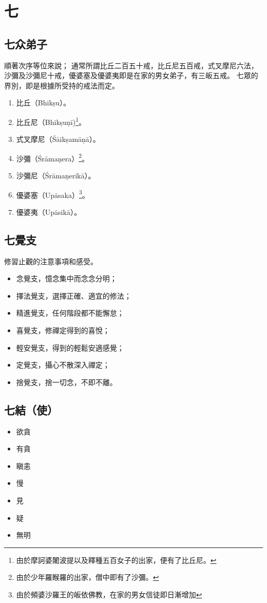 \section{七}

\subsection{七众弟子}
順著次序等位來說；
通常所謂比丘二百五十戒，比丘尼五百戒，式叉摩尼六法，沙彌及沙彌尼十戒，優婆塞及優婆夷即是在家的男女弟子，有三皈五戒。
七眾的界別，即是根據所受持的戒法而定。
\begin{enumerate}
  \item 比丘（Bhikṣu）。
  \item 比丘尼（Bhikṣuṇī)\footnote{由於摩訶婆闍波提以及釋種五百女子的出家，便有了比丘尼。}。
  \item 式叉摩尼（Śāikṣamāṇā）。
  \item 沙彌（Śrāmaṇera）\footnote{由於少年羅睺羅的出家，僧中即有了沙彌。}。
  \item 沙彌尼（Śrāmaṇerikā）。
  \item 優婆塞（Upāsaka）\footnote{由於頻婆沙羅王的皈依佛教，在家的男女信徒即日漸增加}。
  \item 優婆夷（Upāsikā）。
\end{enumerate}


\subsection{七覺支}
修習止觀的注意事項和感受。
\begin{itemize}
  \item 念覺支，憶念集中而念念分明；
  \item 擇法覺支，選擇正確、適宜的修法；
  \item 精進覺支，任何階段都不能懈怠；
  \item 喜覺支，修禪定得到的喜悅；
  \item 輕安覺支，得到的輕鬆安適感覺；
  \item 定覺支，攝心不散深入禪定；
  \item 捨覺支，捨一切念，不即不離。
\end{itemize}

\subsection{七結（使）}
\begin{itemize}
  \item 欲貪
  \item 有貪
  \item 瞋恚
  \item 慢
  \item 見
  \item 疑
  \item 無明
\end{itemize}
